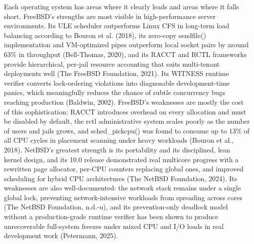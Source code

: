 Each operating system has areas where it clearly leads and areas where it falls short. FreeBSD's strengths are most visible in high-performance server environments. Its ULE scheduler outperforms Linux CFS in long-term load balancing according to Bouron et al. (2018), its zero-copy sendfile() implementation and VM-optimized pipes outperform local socket pairs by around 63\% in throughput (Bell-Thomas, 2020), and its RACCT and RCTL frameworks provide hierarchical, per-jail resource accounting that suits multi-tenant deployments well (The FreeBSD Foundation, 2021). Its WITNESS runtime verifier converts lock-ordering violations into diagnosable development-time panics, which meaningfully reduces the chance of subtle concurrency bugs reaching production (Baldwin, 2002). FreeBSD's weaknesses are mostly the cost of this sophistication: RACCT introduces overhead on every allocation and must be disabled by default, the rctl administrative system scales poorly as the number of users and jails grows, and sched\_pickcpu() was found to consume up to 13\% of all CPU cycles in placement scanning under heavy workloads (Bouron et al., 2018). NetBSD's greatest strength is its portability and its disciplined, lean kernel design, and its 10.0 release demonstrated real multicore progress with a rewritten page allocator, per-CPU counters replacing global ones, and improved scheduling for hybrid CPU architectures (The NetBSD Foundation, 2024). Its weaknesses are also well-documented: the network stack remains under a single global lock, preventing network-intensive workloads from spreading across cores (The NetBSD Foundation, n.d.-u), and its prevention-only deadlock model without a production-grade runtime verifier has been shown to produce unrecoverable full-system freezes under mixed CPU and I/O loads in real development work (Petermann, 2025).


